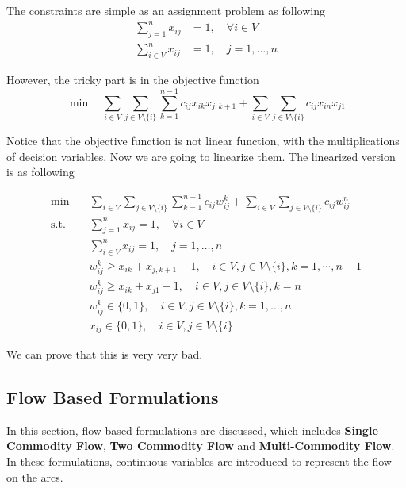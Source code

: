 					The constraints are simple as an assignment problem as following
					\begin{align}
						\sum_{j = 1}^n x_{ij} &= 1, \quad \forall i \in V\\
						\sum_{i \in V}^n x_{ij} &= 1, \quad j = 1, \dots, n
					\end{align}

					However, the tricky part is in the objective function
					\begin{equation}
						\min \quad \sum_{i \in V} \sum_{j \in V \setminus \{i\}} \sum_{k = 1}^{n - 1} c_{ij} x_{ik} x_{j, k + 1} + \sum_{i \in V} \sum_{j \in V \setminus \{i\}} c_{ij}x_{in}x_{j1}
					\end{equation}

					Notice that the objective function is not linear function, with the multiplications of decision variables. Now we are going to linearize them. The linearized version is as following

					\begin{align}
						\min \quad & \sum_{i \in V} \sum_{j \in V \setminus \{i\}} \sum_{k = 1}^{n - 1} c_{ij} w_{ij}^k + \sum_{i \in V} \sum_{j \in V \setminus \{i\}} c_{ij}w_{ij}^n\\
						\text{s.t.} \quad & \sum_{j = 1}^n x_{ij} = 1, \quad \forall i \in V\\
										  & \sum_{i \in V}^n x_{ij} = 1, \quad j = 1, \dots, n\\
										  & w_{ij}^k \ge x_{ik} + x_{j, k + 1} - 1, \quad i \in V,  j \in V \setminus \{i\}, k = 1, \cdots, n - 1\\
										  & w_{ij}^k \ge x_{ik} + x_{j1} - 1, \quad i \in V, j \in V \setminus \{i\}, k = n \\
										  & w_{ij}^k \in \{0, 1\}, \quad i \in V, j \in V \setminus \{i\}, k = 1, \dots, n\\
										  & x_{ij} \in \{0, 1\}, \quad i \in V, j \in V \setminus \{i\}
					\end{align}

					We can prove that this is very very bad.


				\subsection{Flow Based Formulations}
					In this section, flow based formulations are discussed, which includes \textbf{Single Commodity Flow}, \textbf{Two Commodity Flow} and \textbf{Multi-Commodity Flow}. In these formulations, continuous variables are introduced to represent the flow on the arcs.

